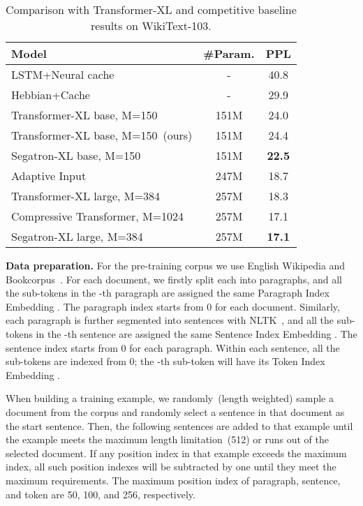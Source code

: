 \documentclass[letterpaper]{article}
\begin{document}
\begin{table*}[t]\centering
  \small
  \begin{tabular}{lcc}\toprule
  Model &\#Param. &PPL \\\midrule
  LSTM+Neural cache~\cite{DBLP:conf/iclr/GraveJU17} &- &40.8 \\
  Hebbian+Cache~\cite{DBLP:conf/icml/RaeDDL18} &- &29.9 \\
  Transformer-XL base, M=150~\cite{DBLP:conf/acl/DaiYYCLS19} &151M &24.0 \\
  Transformer-XL base, M=150~(ours) &151M &24.4 \\
  Segatron-XL base, M=150 &151M &\textbf{22.5} \\
  \hline
  Adaptive Input~\cite{DBLP:conf/iclr/BaevskiA19} & 247M &18.7 \\
  Transformer-XL large, M=384~\cite{DBLP:conf/acl/DaiYYCLS19} &257M &18.3 \\
  Compressive Transformer, M=1024~\cite{DBLP:conf/iclr/RaePJHL20} &257M&17.1 \\
  Segatron-XL large, M=384 &257M &\textbf{17.1} \\
  \bottomrule
  \end{tabular}
  \caption{Comparison with Transformer-XL and competitive baseline results on WikiText-103.}\label{tab: wiki103}
\end{table*} \smallskip\noindent\textbf{Data preparation.}
For the pre-training corpus we use English Wikipedia and Bookcorpus~\cite{DBLP:conf/iccv/bookcorpus}.
For each document, we firstly split each into  paragraphs, and all the sub-tokens in the -th paragraph are assigned the same Paragraph Index Embedding .
The paragraph index starts from 0 for each document.
Similarly, each paragraph is further segmented into  sentences with NLTK~\cite{DBLP:books/daglib/nltk}, and all the sub-tokens in the -th sentence are assigned the same Sentence Index Embedding .
The sentence index starts from 0 for each paragraph.
Within each sentence, all the sub-tokens are indexed from 0; 
the -th sub-token will have its Token Index Embedding .

When building a training example, we randomly~(length weighted) sample a document from the corpus and randomly select a sentence in that document as the start sentence. 
Then, the following sentences are added to that example until the example meets the maximum length limitation~(512) or runs out of the selected document.
If any position index in that example exceeds the maximum index, all such position indexes will be subtracted by one until they meet the maximum requirements.
The maximum position index of paragraph, sentence, and token are 50, 100, and 256, respectively.
\end{document}
